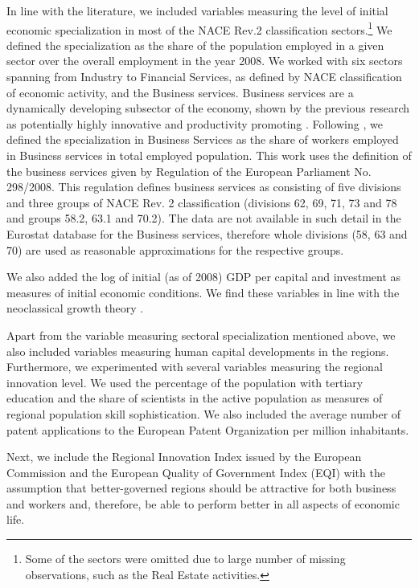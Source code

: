 \documentclass[11pt]{article}
\begin{document}
In line with the literature, we included variables measuring the level of initial economic specialization in most of the NACE Rev.2 classification sectors.\footnote{Some of the sectors were omitted due to large number of missing observations, such as the Real Estate activities.} We defined the specialization as the share of the population employed in a given sector over the overall employment in the year 2008. We worked with six sectors spanning from Industry to Financial Services, as defined by NACE classification of economic activity, and the Business services. Business services are a dynamically developing subsector of the economy, shown by the previous research as potentially highly innovative and productivity promoting \citep{corrocher2014kibs}. Following \citet{guastella2015knowledge}, we defined the specialization in Business Services as the share of workers employed in Business services in total employed population. This work uses the definition of the business services given by Regulation of the European Parliament No. 298/2008. This regulation defines business services as consisting of five divisions and three groups of NACE Rev. 2 classification (divisions 62, 69, 71, 73 and 78 and groups 58.2, 63.1 and 70.2). The data are not available in such detail in the Eurostat database for the Business services, therefore whole divisions (58, 63 and 70) are used as reasonable approximations for the respective groups.

We also added the log of initial (as of 2008) GDP per capital and investment as measures of initial economic conditions. We find these variables in line with the neoclassical growth theory \cite{iammarino2017regional}.

Apart from the variable measuring sectoral specialization mentioned above, we also included variables measuring human capital developments in the regions. Furthermore, we experimented with several variables measuring the regional innovation level. We used the percentage of the population with tertiary education and the share of scientists in the active population as measures of regional population skill sophistication. We also included the average number of patent applications to the European Patent Organization per million inhabitants. 

Next, we include the Regional Innovation Index issued by the European Commission and the European Quality of Government Index (EQI) with the assumption that better-governed regions should be attractive for both business and workers and, therefore, be able to perform better in all aspects of economic life.
\end{document}
